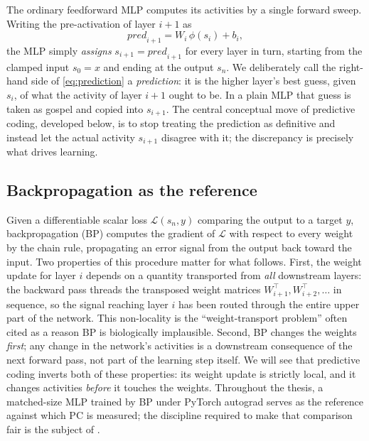 The ordinary feedforward MLP computes its activities by a single forward sweep. Writing the
pre-activation of layer $i+1$ as
\begin{equation}
  \mathit{pred}_{i+1} = W_i\,\phi(s_i) + b_i ,
  \label{eq:prediction}
\end{equation}
the MLP simply \emph{assigns} $s_{i+1} = \mathit{pred}_{i+1}$ for every layer in turn, starting
from the clamped input $s_0 = x$ and ending at the output $s_n$. We deliberately call the
right-hand side of \cref{eq:prediction} a \emph{prediction}: it is the higher layer's best guess,
given $s_i$, of what the activity of layer $i+1$ ought to be. In a plain MLP that guess is taken
as gospel and copied into $s_{i+1}$. The central conceptual move of predictive coding, developed
below, is to stop treating the prediction as definitive and instead let the actual activity
$s_{i+1}$ disagree with it; the discrepancy is precisely what drives learning.

\subsection{Backpropagation as the reference}

Given a differentiable scalar loss $\mathcal{L}(s_n, y)$ comparing the output to a target $y$,
backpropagation (BP) computes the gradient of $\mathcal{L}$ with respect to every weight by the
chain rule, propagating an error signal from the output back toward the input. Two properties of
this procedure matter for what follows. First, the weight update for layer $i$ depends on a
quantity transported from \emph{all} downstream layers: the backward pass threads the transposed
weight matrices $W_{i+1}^\top, W_{i+2}^\top, \dots$ in sequence, so the signal reaching layer $i$
has been routed through the entire upper part of the network. This non-locality is the
``weight-transport problem'' often cited as a reason BP is biologically implausible. Second, BP
changes the weights \emph{first}; any change in the network's activities is a downstream
consequence of the next forward pass, not part of the learning step itself. We will see that
predictive coding inverts both of these properties: its weight update is strictly local, and it
changes activities \emph{before} it touches the weights. Throughout the thesis, a matched-size MLP
trained by BP under PyTorch autograd \citep{paszke2019pytorch} serves as the reference against
which PC is measured; the discipline required to make that comparison fair is the subject of
.


